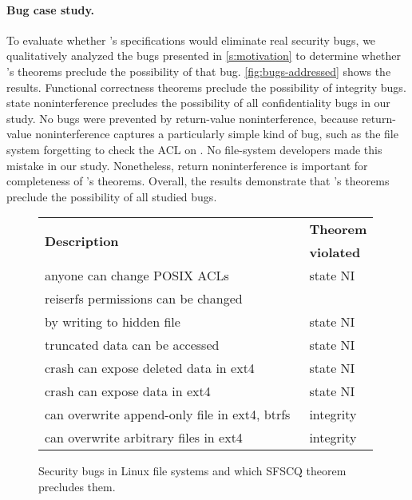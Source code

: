 \paragraph{Bug case study.}

To evaluate whether \sfscq's specifications would eliminate real
security bugs, we qualitatively analyzed the bugs presented in
\autoref{s:motivation} to determine whether \sfscq's theorems preclude
the possibility of that bug.  \autoref{fig:bugs-addressed} shows the
results.  Functional correctness theorems preclude the possibility of
integrity bugs.  \sys state noninterference precludes the possibility
of all confidentiality bugs in our study.  No bugs were prevented by
return-value noninterference, because return-value noninterference captures a
particularly simple kind of bug, such as the file system forgetting
to check the ACL on .  No file-system developers made this
mistake in our study.  Nonetheless, return noninterference is important
for completeness of \sfscq's theorems.  Overall, the results demonstrate
that \sfscq's theorems preclude the possibility of all studied bugs.

\begin{figure}[ht]
  \centering
  \small
  \begin{tabular}{@{}p{2.4in}p{0.5in}@{}}
    \toprule
    \multirow{2}{*}{\textbf{Description}} & \textbf{Theorem} \\ & \textbf{violated} \\
    \midrule
    anyone can change POSIX ACLs~\cite{CVE-2010-2071, CVE-2010-1641, CVE-2016-1237} & state NI \\
    reiserfs permissions can be changed \\ \quad by writing to hidden file~\cite{CVE-2010-1146} & state NI \\
    truncated data can be accessed~\cite{CVE-2015-8374}
                         & state NI \\
    crash can expose deleted data in ext4~\cite{CVE-2017-7495} & state NI \\
    crash can expose data in ext4~\cite{git:469017} & state NI \\
    can overwrite append-only file in ext4, btrfs~\cite{CVE-2010-2066, CVE-2010-2537} & integrity \\
    can overwrite arbitrary files in ext4~\cite{CVE-2009-4131} & integrity \\
    \bottomrule
  \end{tabular}
  \caption{Security bugs in Linux file systems and which SFSCQ theorem precludes them.}
  \label{fig:bugs-addressed}
\end{figure}



